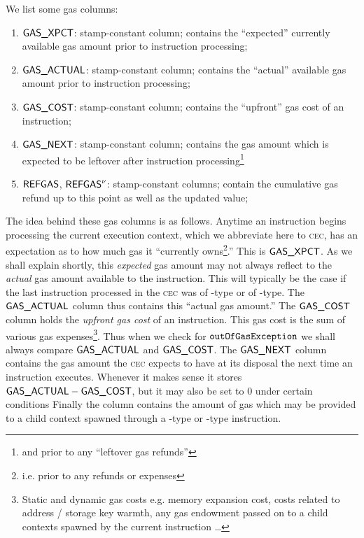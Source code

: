 \noindent We list some gas columns:
\begin{enumerate}[resume]
	\item $\textsf{GAS}\textsf{\_XPCT}$:
		stamp-constant column; contains the ``expected'' currently available  gas amount prior to instruction processing;
	\item $\textsf{GAS}\textsf{\_ACTUAL}$:
		stamp-constant column; contains the ``actual'' available  gas amount prior to instruction processing;
	\item $\textsf{GAS}\textsf{\_COST}$:
		stamp-constant column; contains the ``upfront'' gas cost of an instruction;
	\item $\textsf{GAS}\textsf{\_NEXT}$:
		stamp-constant column; contains the gas amount which is expected to be leftover after instruction processing\footnote{and prior to any ``leftover gas refunds''}
	\item $\textsf{REFGAS}$, $\textsf{REFGAS}^{\nu}$:
		 stamp-constant columns; contain the cumulative gas refund up to this point as well as the updated value;
\end{enumerate}
The idea behind these gas columns is as follows.
Anytime an instruction begins processing the current execution context, which we abbreviate here to \textsc{cec}, has an expectation as to how much gas it ``currently owns\footnote{i.e. prior to any refunds or expenses}.''
This is $\textsf{GAS}\textsf{\_XPCT}$.
As we shall explain shortly, this \emph{expected} gas amount may not always reflect to the \emph{actual} gas amount available to the instruction.
This will typically be the case if the last instruction processed in the \textsc{cec} was of -type or of -type.
The $\textsf{GAS}\textsf{\_ACTUAL}$ column thus contains this ``actual gas amount.''
The $\textsf{GAS}\textsf{\_COST}$ column holds the \emph{upfront gas cost} of an instruction.
This gas cost is the sum of various gas expenses\footnote{Static and dynamic gas costs e.g. memory expansion cost, costs related to address / storage key warmth, any gas endowment passed on to a child contexts spawned by the current instruction \dots{}}.
Thus when we check for $\texttt{outOfGasException}$ we shall always compare $\textsf{GAS}\textsf{\_ACTUAL}$ and $\textsf{GAS}\textsf{\_COST}$.
The $\textsf{GAS}\textsf{\_NEXT}$ column contains the gas amount the \textsc{cec} expects to have at its disposal the next time an instruction executes.
Whenever it makes sense it stores $\textsf{GAS}\textsf{\_ACTUAL}- \textsf{GAS}\textsf{\_COST}$, but it may also be set to 0 under certain conditions
Finally the \gasStipend{} column contains the amount of gas which may be provided to a child context spawned through a -type or -type instruction. 

